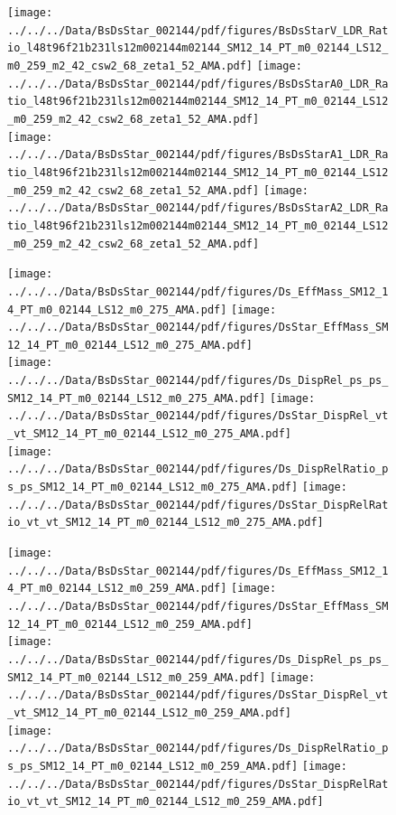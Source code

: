 \documentclass[a4paper,10pt]{article}
\begin{document}
\begin{figure}[p]
 \texttt{[image: ../../../Data/BsDsStar\_002144/pdf/figures/BsDsStarV\_LDR\_Ratio\_l48t96f21b231ls12m002144m02144\_SM12\_14\_PT\_m0\_02144\_LS12\_m0\_259\_m2\_42\_csw2\_68\_zeta1\_52\_AMA.pdf]}  
\texttt{[image: ../../../Data/BsDsStar\_002144/pdf/figures/BsDsStarA0\_LDR\_Ratio\_l48t96f21b231ls12m002144m02144\_SM12\_14\_PT\_m0\_02144\_LS12\_m0\_259\_m2\_42\_csw2\_68\_zeta1\_52\_AMA.pdf]} \\ 
\texttt{[image: ../../../Data/BsDsStar\_002144/pdf/figures/BsDsStarA1\_LDR\_Ratio\_l48t96f21b231ls12m002144m02144\_SM12\_14\_PT\_m0\_02144\_LS12\_m0\_259\_m2\_42\_csw2\_68\_zeta1\_52\_AMA.pdf]}  
\texttt{[image: ../../../Data/BsDsStar\_002144/pdf/figures/BsDsStarA2\_LDR\_Ratio\_l48t96f21b231ls12m002144m02144\_SM12\_14\_PT\_m0\_02144\_LS12\_m0\_259\_m2\_42\_csw2\_68\_zeta1\_52\_AMA.pdf]} \\ 
\end{figure} 
\clearpage

\begin{figure}[p]
 \texttt{[image: ../../../Data/BsDsStar\_002144/pdf/figures/Ds\_EffMass\_SM12\_14\_PT\_m0\_02144\_LS12\_m0\_275\_AMA.pdf]}  
\texttt{[image: ../../../Data/BsDsStar\_002144/pdf/figures/DsStar\_EffMass\_SM12\_14\_PT\_m0\_02144\_LS12\_m0\_275\_AMA.pdf]} \\ 
\texttt{[image: ../../../Data/BsDsStar\_002144/pdf/figures/Ds\_DispRel\_ps\_ps\_SM12\_14\_PT\_m0\_02144\_LS12\_m0\_275\_AMA.pdf]}  
\texttt{[image: ../../../Data/BsDsStar\_002144/pdf/figures/DsStar\_DispRel\_vt\_vt\_SM12\_14\_PT\_m0\_02144\_LS12\_m0\_275\_AMA.pdf]} \\ 
\texttt{[image: ../../../Data/BsDsStar\_002144/pdf/figures/Ds\_DispRelRatio\_ps\_ps\_SM12\_14\_PT\_m0\_02144\_LS12\_m0\_275\_AMA.pdf]}  
\texttt{[image: ../../../Data/BsDsStar\_002144/pdf/figures/DsStar\_DispRelRatio\_vt\_vt\_SM12\_14\_PT\_m0\_02144\_LS12\_m0\_275\_AMA.pdf]} \\ 
\end{figure} 
\clearpage

\begin{figure}[p]
 \texttt{[image: ../../../Data/BsDsStar\_002144/pdf/figures/Ds\_EffMass\_SM12\_14\_PT\_m0\_02144\_LS12\_m0\_259\_AMA.pdf]}  
\texttt{[image: ../../../Data/BsDsStar\_002144/pdf/figures/DsStar\_EffMass\_SM12\_14\_PT\_m0\_02144\_LS12\_m0\_259\_AMA.pdf]} \\ 
\texttt{[image: ../../../Data/BsDsStar\_002144/pdf/figures/Ds\_DispRel\_ps\_ps\_SM12\_14\_PT\_m0\_02144\_LS12\_m0\_259\_AMA.pdf]}  
\texttt{[image: ../../../Data/BsDsStar\_002144/pdf/figures/DsStar\_DispRel\_vt\_vt\_SM12\_14\_PT\_m0\_02144\_LS12\_m0\_259\_AMA.pdf]} \\ 
\texttt{[image: ../../../Data/BsDsStar\_002144/pdf/figures/Ds\_DispRelRatio\_ps\_ps\_SM12\_14\_PT\_m0\_02144\_LS12\_m0\_259\_AMA.pdf]}  
\texttt{[image: ../../../Data/BsDsStar\_002144/pdf/figures/DsStar\_DispRelRatio\_vt\_vt\_SM12\_14\_PT\_m0\_02144\_LS12\_m0\_259\_AMA.pdf]} \\ 
\end{figure} 
\clearpage
\end{document}

